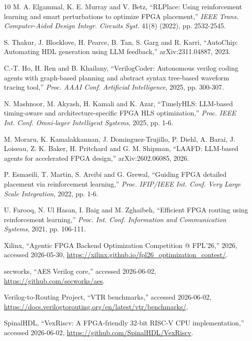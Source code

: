 \documentclass[conference]{IEEEtran}
\begin{document}
\begin{thebibliography}{10}
M. A. Elgammal, K. E. Murray and V. Betz, ``{RLPlace}: Using
reinforcement learning and smart perturbations to optimize {FPGA}
placement,'' {\em IEEE Trans. Computer-Aided Design Integr. Circuits
Syst.} 41(8) (2022), pp. 2532-2545.

S. Thakur, J. Blocklove, H. Pearce, B. Tan, S. Garg and R. Karri,
``{AutoChip}: Automating {HDL} generation using {LLM} feedback,''
arXiv:2311.04887, 2023.

C.-T. Ho, H. Ren and B. Khailany, ``{VerilogCoder}: Autonomous verilog
coding agents with graph-based planning and abstract syntax tree-based
waveform tracing tool,'' {\em Proc. AAAI Conf. Artificial Intelligence},
2025, pp. 300-307.

N. Mashnoor, M. Akyash, H. Kamali and K. Azar, ``{TimelyHLS}:
{LLM}-based timing-aware and architecture-specific {FPGA} {HLS}
optimization,'' {\em Proc. IEEE Int. Conf. Omni-layer Intelligent
Systems}, 2025, pp. 1-6.

M. Moraru, K. Kamalakkannan, J. Dominguez-Trujillo, P. Diehl, A. Barai,
J. Loiseau, Z. K. Baker, H. Pritchard and G. M. Shipman, ``{LAAFD}:
{LLM}-based agents for accelerated {FPGA} design,'' arXiv:2602.06085,
2026.

P. Esmaeili, T. Martin, S. Areibi and G. Grewal, ``Guiding {FPGA}
detailed placement via reinforcement learning,'' {\em Proc. IFIP/IEEE
Int. Conf. Very Large Scale Integration}, 2022, pp. 1-6.

U. Farooq, N. Ul Hasan, I. Baig and M. Zghaibeh, ``Efficient {FPGA}
routing using reinforcement learning,'' {\em Proc. Int. Conf.
Information and Communication Systems}, 2021, pp. 106-111.

{Xilinx}, ``{Agentic FPGA Backend Optimization Competition @ FPL'26},''
2026, accessed 2026-05-30,
\url{https://xilinx.github.io/fpl26_optimization_contest/}.

{secworks}, ``{AES} {Verilog} core,'' accessed 2026-06-02,
\url{https://github.com/secworks/aes}.

{Verilog-to-Routing Project}, ``{VTR} benchmarks,'' accessed 2026-06-02,
\url{https://docs.verilogtorouting.org/en/latest/vtr/benchmarks/}.

{SpinalHDL}, ``{VexRiscv}: A {FPGA}-friendly 32-bit {RISC-V} {CPU}
implementation,'' accessed 2026-06-02,
\url{https://github.com/SpinalHDL/VexRiscv}.


\end{thebibliography}
\end{document}
